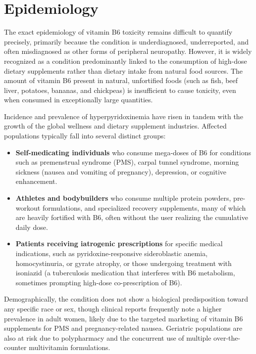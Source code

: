 \section*{Epidemiology}
The exact epidemiology of vitamin B6 toxicity remains difficult to quantify precisely, primarily because the condition is underdiagnosed, underreported, and often misdiagnosed as other forms of peripheral neuropathy. However, it is widely recognized as a condition predominantly linked to the consumption of high-dose dietary supplements rather than dietary intake from natural food sources. The amount of vitamin B6 present in natural, unfortified foods (such as fish, beef liver, potatoes, bananas, and chickpeas) is insufficient to cause toxicity, even when consumed in exceptionally large quantities.

Incidence and prevalence of hyperpyridoxinemia have risen in tandem with the growth of the global wellness and dietary supplement industries. Affected populations typically fall into several distinct groups:
\begin{itemize}
    \item \textbf{Self-medicating individuals} who consume mega-doses of B6 for conditions such as premenstrual syndrome (PMS), carpal tunnel syndrome, morning sickness (nausea and vomiting of pregnancy), depression, or cognitive enhancement.
    \item \textbf{Athletes and bodybuilders} who consume multiple protein powders, pre-workout formulations, and specialized recovery supplements, many of which are heavily fortified with B6, often without the user realizing the cumulative daily dose.
    \item \textbf{Patients receiving iatrogenic prescriptions} for specific medical indications, such as pyridoxine-responsive sideroblastic anemia, homocystinuria, or gyrate atrophy, or those undergoing treatment with isoniazid (a tuberculosis medication that interferes with B6 metabolism, sometimes prompting high-dose co-prescription of B6).
\end{itemize}

Demographically, the condition does not show a biological predisposition toward any specific race or sex, though clinical reports frequently note a higher prevalence in adult women, likely due to the targeted marketing of vitamin B6 supplements for PMS and pregnancy-related nausea. Geriatric populations are also at risk due to polypharmacy and the concurrent use of multiple over-the-counter multivitamin formulations.


